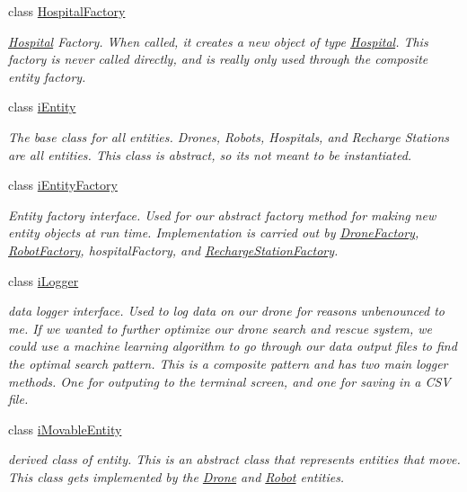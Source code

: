 \begin{DoxyCompactItemize}
class \hyperlink{classHospitalFactory}{Hospital\+Factory}
\begin{DoxyCompactList}\small\item\em \hyperlink{classHospital}{Hospital} Factory. When called, it creates a new object of type \hyperlink{classHospital}{Hospital}. This factory is never called directly, and is really only used through the composite entity factory. \end{DoxyCompactList}\item 
class \hyperlink{classiEntity}{i\+Entity}
\begin{DoxyCompactList}\small\item\em The base class for all entities. Drones, Robots, Hospitals, and Recharge Stations are all entities. This class is abstract, so it\textquotesingle{}s not meant to be instantiated. \end{DoxyCompactList}\item 
class \hyperlink{classiEntityFactory}{i\+Entity\+Factory}
\begin{DoxyCompactList}\small\item\em Entity factory interface. Used for our abstract factory method for making new entity objects at run time. Implementation is carried out by \hyperlink{classDroneFactory}{Drone\+Factory}, \hyperlink{classRobotFactory}{Robot\+Factory}, hospital\+Factory, and \hyperlink{classRechargeStationFactory}{Recharge\+Station\+Factory}. \end{DoxyCompactList}\item 
class \hyperlink{classiLogger}{i\+Logger}
\begin{DoxyCompactList}\small\item\em data logger interface. Used to log data on our drone for reasons unbenounced to me. If we wanted to further optimize our drone search and rescue system, we could use a machine learning algorithm to go through our data output files to find the optimal search pattern. This is a composite pattern and has two main logger methods. One for outputing to the terminal screen, and one for saving in a C\+SV file. \end{DoxyCompactList}\item 
class \hyperlink{classiMovableEntity}{i\+Movable\+Entity}
\begin{DoxyCompactList}\small\item\em derived class of entity. This is an abstract class that represents entities that move. This class gets implemented by the \hyperlink{classDrone}{Drone} and \hyperlink{classRobot}{Robot} entities. \end{DoxyCompactList}\item 

\end{DoxyCompactItemize}
